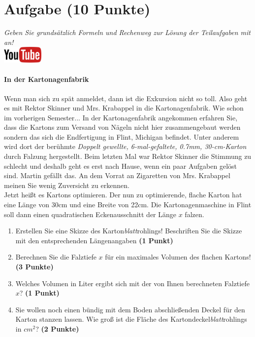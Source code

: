 \documentclass[a4paper, 9pt]{scrartcl}\usepackage[]{graphicx}\usepackage[]{xcolor}
\begin{document}
\section{Aufgabe \hfill (10 Punkte)}

\textit{Geben Sie grunds{\"a}tzlich Formeln und Rechenweg zur L{\"o}sung der
  Teilaufgaben mit an!} \\[1Ex]

\hfill\href{https://youtu.be/RuzMjwvwT-4}{\includegraphics[width =
  2cm]{img/youtube}} %
\hspace{2Ex}

\paragraph{In der Kartonagenfabrik}



Wenn man sich zu sp{\"a}t anmeldet, dann ist die Exkursion nicht so toll. Also
geht es mit Rektor Skinner und Mrs. Krabappel in die Kartonagenfabrik. Wie
schon im vorherigen Semester... In der Kartonagenfabrik angekommen erfahren
Sie, dass die Kartons zum Versand von N{\"a}geln nicht hier zusammengebaut
werden sondern das sich die Endfertigung in Flint, Michigan befindet. Unter
anderem wird dort der ber{\"u}hmte \textit{Doppelt gewellte,
  6-mal-gefaltete, 0.7mm, 30-cm-Karton} durch
Falzung hergestellt. Beim letzten Mal war Rektor Skinner die Stimmung zu
schlecht und deshalb geht es erst nach Hause, wenn ein paar Aufgaben gel{\"o}st
sind. Martin gef{\"a}llt das. An dem Vorrat
an Zigaretten von Mrs. Krabappel meinen Sie wenig Zuversicht zu erkennen.\\

Jetzt hei{\ss}t es Kartons optimieren. Der nun zu optimierende, flache Karton
hat eine L{\"a}nge von 30cm und eine Breite von 22cm. Die
Kartonagenmaschine in Flint soll dann einen quadratischen Eckenausschnitt
der L{\"a}nge $x$ falzen.

\begin{enumerate}
\item Erstellen Sie eine Skizze des Karton\textit{blatt}rohlings!
  Beschriften Sie die Skizze mit den entsprechenden L{\"a}ngenangaben
  \textbf{(1 Punkt)}
\item Berechnen Sie die Falztiefe $x$ f{\"u}r ein maximales Volumen des flachen
  Kartons! \textbf{(3 Punkte)}
\item Welches Volumen in Liter ergibt sich mit der von Ihnen berechneten
  Falztiefe $x$?  \textbf{(1 Punkt)}
\item Sie wollen noch einen b{\"u}ndig mit dem Boden abschlie{\ss}enden Deckel f{\"u}r
  den Karton stanzen lassen. Wie gro{\ss} ist die Fl{\"a}che des
  Kartondeckel\textit{blatt}rohlings in $cm^2$? \textbf{(2 Punkte)}
\end{enumerate}
\end{document}
